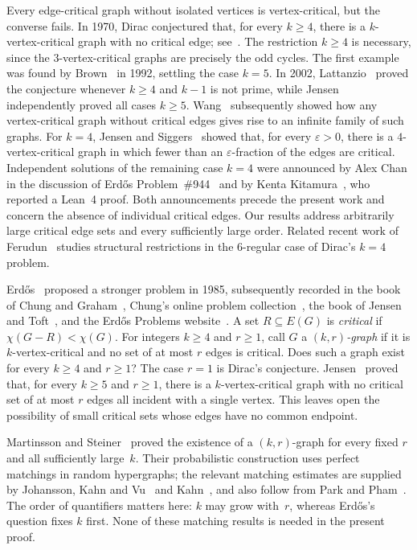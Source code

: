 \documentclass[11pt,letterpaper]{article}
\numberwithin{equation}{section}
\theoremstyle{plain}
\theoremstyle{definition}
\theoremstyle{remark}
\begin{document}
Every edge-critical graph without isolated vertices is vertex-critical, but the converse fails. In 1970, Dirac conjectured that, for every $k\ge 4$, there is a $k$-vertex-critical graph with no critical edge; see~\cite{Erdos1989,Lattanzio}. The restriction $k\ge 4$ is necessary, since the $3$-vertex-critical graphs are precisely the odd cycles. The first example was found by Brown~\cite{Brown} in 1992, settling the case $k=5$. In 2002, Lattanzio~\cite{Lattanzio} proved the conjecture whenever $k\ge 4$ and $k-1$ is not prime, while Jensen~\cite{Jensen2002} independently proved all cases $k\ge 5$. Wang~\cite{Wang} subsequently showed how any vertex-critical graph without critical edges gives rise to an infinite family of such graphs. For $k=4$, Jensen and Siggers~\cite{JensenSiggers} showed that, for every $\varepsilon>0$, there is a $4$-vertex-critical graph in which fewer than an $\varepsilon$-fraction of the edges are critical. Independent solutions of the remaining case $k=4$ were announced by Alex Chan in the discussion of Erd\H{o}s Problem~\#944~\cite{Bloom944} and by Kenta Kitamura~\cite{Kitamura}, who reported a Lean~4 proof. Both announcements precede the present work and concern the absence of individual critical edges. Our results address arbitrarily large critical edge sets and every sufficiently large order. Related recent work of Ferudun~\cite{Ferudun} studies structural restrictions in the $6$-regular case of Dirac's $k=4$ problem.

Erd\H{o}s~\cite{Erdos1989} proposed a stronger problem in 1985, subsequently recorded in the book of Chung and Graham~\cite{ChungGraham}, Chung's online problem collection~\cite{ChungOnline}, the book of Jensen and Toft~\cite{JensenToft}, and the Erd\H{o}s Problems website~\cite{Bloom944}. A set $R\subseteq E(G)$ is \emph{critical} if $\chi(G-R)<\chi(G)$. For integers $k\ge 4$ and $r\ge 1$, call $G$ a \emph{$(k,r)$-graph} if it is $k$-vertex-critical and no set of at most $r$ edges is critical. Does such a graph exist for every $k\ge 4$ and $r\ge 1$? The case $r=1$ is Dirac's conjecture. Jensen~\cite{Jensen2002} proved that, for every $k\ge 5$ and $r\ge 1$, there is a $k$-vertex-critical graph with no critical set of at most $r$ edges all incident with a single vertex. This leaves open the possibility of small critical sets whose edges have no common endpoint.

Martinsson and Steiner~\cite{MartinssonSteiner} proved the existence of a $(k,r)$-graph for every fixed $r$ and all sufficiently large~$k$. Their probabilistic construction uses perfect matchings in random hypergraphs; the relevant matching estimates are supplied by Johansson, Kahn and Vu~\cite{JohanssonKahnVu} and Kahn~\cite{Kahn}, and also follow from Park and Pham~\cite{ParkPham}. The order of quantifiers matters here: $k$ may grow with~$r$, whereas Erd\H{o}s's question fixes $k$ first. None of these matching results is needed in the present proof.
\end{document}
